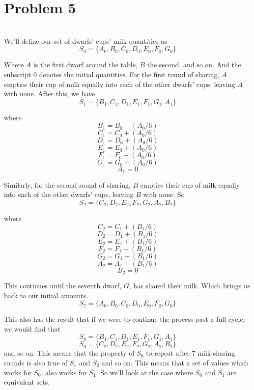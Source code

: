 \documentclass[12pt]{article}
\begin{document}
\section*{Problem 5}
\\

We'll define our set of dwarfs' cups' milk quantities as
\[S_0 = \{A_0, B_0, C_0, D_0, E_0, F_0, G_0\}\]

Where $A$ is the first dwarf around the table, $B$ the second, and so on. And the subscript 0 denotes the initial quantities. For the first round of sharing, $A$ empties their cup of milk equally into each of the other dwarfs' cups, leaving $A$ with none. After this, we have
\[S_1 = \{B_1, C_1, D_1, E_1, F_1, G_1, A_1\}\]

where
\[B_1 = B_0 + (A_0/6)\]
\[C_1 = C_0 + (A_0/6)\]
\[D_1 = D_0 + (A_0/6)\]
\[E_1 = E_0 + (A_0/6)\]
\[F_1 = F_0 + (A_0/6)\]
\[G_1 = G_0 + (A_0/6)\]
\[A_1 = 0\]

Similarly, for the second round of sharing, $B$ empties their cup of milk equally into each of the other dwarfs' cups, leaving $B$ with none. So
\[S_2 = \{C_2, D_2, E_2, F_2, G_2, A_2, B_2\}\]

where
\[C_2 = C_1 + (B_1/6)\]
\[D_2 = D_1 + (B_1/6)\]
\[E_2 = E_1 + (B_1/6)\]
\[F_2 = F_1 + (B_1/6)\]
\[G_2 = G_1 + (B_1/6)\]
\[A_2 = A_1 + (B_1/6)\]
\[B_2 = 0\]

This continues until the seventh dwarf, $G$, has shared their milk. Which brings us back to our initial amounts.
\[S_7 = \{A_0, B_0, C_0, D_0, E_0, F_0, G_0\}\]

This also has the result that if we were to continue the process past a full cycle, we would find that
\[S_8 = \{B_1, C_1, D_1, E_1, F_1, G_1, A_1\}\]
\[S_9 = \{C_2, D_2, E_2, F_2, G_2, A_2, B_2\}\]
and so on. This means that the property of $S_0$ to repeat after 7 milk sharing rounds is also true of $S_1$ and $S_2$ and so on. This means that a set of values which works for $S_0$, also works for $S_1$. So we'll look at the case where $S_0$ and $S_1$ are equivalent sets.
\end{document}

